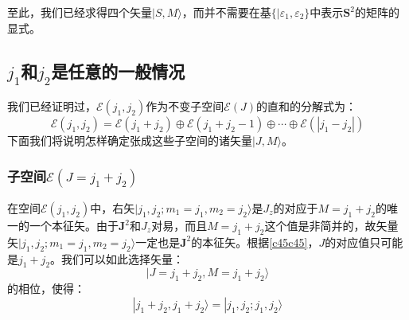 \documentclass[]{article}
\begin{document}
至此，我们已经求得四个矢量$|S,M\rangle$，而并不需要在基$\{|\varepsilon_1,\varepsilon_2\}$中表示$\boldsymbol{S}^2$的矩阵的显式。
\subsection{$j_1$和$j_2$是任意的一般情况}
我们已经证明过，$\mathscr{E}(j_1,j_2)$作为不变子空间$\mathscr{E}(J)$的直和的分解式为：
\begin{equation}
	\mathscr{E}(j_1,j_2)=\mathscr{E}(j_1+j_2)\oplus\mathscr{E}(j_1+j_2-1)\oplus\cdots\oplus\mathscr{E}(|j_1-j_2|)
	\label{c54c54}
\end{equation}
下面我们将说明怎样确定张成这些子空间的诸矢量$|J,M\rangle$。
\subsubsection{子空间$\mathscr{E}(J=j_1+j_2)$}
在空间$\mathscr{E}(j_1,j_2)$中，右矢$|j_1,j_2;m_1=j_1,m_2=j_2\rangle$是$J_z$的对应于$M=j_1+j_2$的唯一的一个本征矢。由于$\boldsymbol{J}^2$和$J_z$对易，而且$M=j_1+j_2$这个值是非简并的，故矢量矢$|j_1,j_2;m_1=j_1,m_2=j_2\rangle$一定也是$\boldsymbol{J}^2$的本征矢。根据\eqref{c45c45}，$J$的对应值只可能是$j_1+j_2$。我们可以如此选择矢量：
\begin{equation}
	|J=j_1+j_2,M=j_1+j_2\rangle
\end{equation}
的相位，使得：
\begin{equation}
	|j_1+j_2,j_1+j_2\rangle=|j_1,j_2;j_1,j_2\rangle
\end{equation}
\end{document}
